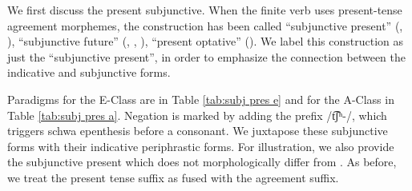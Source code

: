 	We first discuss the present subjunctive. When the finite verb uses present-tense agreement morphemes, the construction has been called “subjunctive present” (\citealt[190]{Minassian-1980-EastArmenianGrammar}, \citealt[160]{Hagopian-2007-ArmenianTextbookEveryone}), “subjunctive future” (\citealt[174]{BardakjianVaux-1999-easternArmeniantextbook}, \citealt[150]{Sakayan-2007-TextbookEasternArmenian}, \citealt[239]{DumTragut-2009-ArmenianReferenceGrammar}), “present optative” (\citealt[149]{fairbanksStevick-1975-spokenEastArmenian}). We label this construction as just the “subjunctive present”, in order to emphasize the connection between the indicative and subjunctive forms. 
	
	Paradigms for the E-Class are in Table \ref{tab:subj pres e} and for the A-Class in Table \ref{tab:subj pres a}. 
	Negation is marked by adding the prefix /{t͡ʃʰ-}/, which triggers schwa epenthesis before a consonant. We juxtapose these subjunctive forms with their indicative periphrastic forms. For illustration, we also provide the {\seaSE} subjunctive present which does not morphologically differ from {\iaIA}. As before, we treat the present tense suffix as fused with the agreement suffix.
	
